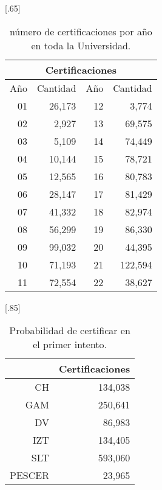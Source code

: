 \documentclass[12pt]{article}
\begin{document}
\begin{table}[ht]
\centering
\scalebox{0.65}[.65]{
\begin{tabular}{||r||r||r|r||}\hline
\multicolumn{4}{|c|}{Certificaciones} \\\hline
Año  & Cantidad  & Año  & Cantidad  \\\hline
01 & 26,173& 12 & 3,774 \\ 
  02 & 2,927 &13 & 69,575  \\ 
  03 & 5,109 & 14 & 74,449\\ 
  04 & 10,144 & 15 & 78,721\\ 
  05 & 12,565 &16 & 80,783 \\ 
  06 & 28,147 &17 & 81,429\\ 
  07 & 41,332 &18 & 82,974\\ 
  08 & 56,299 &19 & 86,330\\ 
  09 & 99,032 &20 & 44,395\\ 
  10 & 71,193 &21 & 122,594 \\ 
  11 & 72,554 &22 & 38,627\\
\hline
\end{tabular}}
\caption{\label{CertificacionesAnual}n\'umero de certificaciones por a\~no en toda la Universidad.}
\end{table}

\begin{table}[ht!]
\centering
\scalebox{0.75}[.85]{
\begin{tabular}{rr}
  \hline
 & Certificaciones \\ 
  \hline
CH & 134,038 \\ 
  GAM & 250,641 \\ 
  DV & 86,983 \\ 
  IZT & 134,405 \\ 
  SLT & 593,060 \\ 
  PESCER & 23,965 \\ 
   \hline
\end{tabular}
}
\caption{\label{Prob_Cert_Intento_1}Probabilidad de certificar en el primer intento.}
\end{table}
\end{document}
